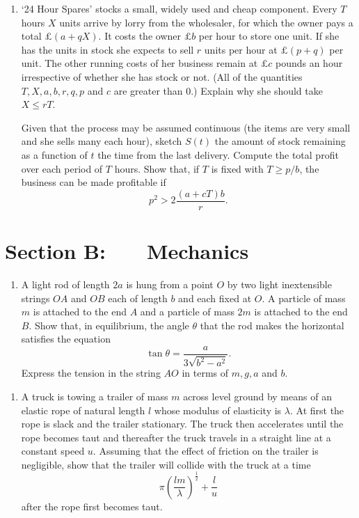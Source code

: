 \documentclass[a4, 11pt]{report}
\newlength{\qspace}
\newcounter{qnumber}
\newenvironment{question}%
 {\vspace{\qspace}
  \begin{enumerate}[\bfseries 1\quad][10]%
    \setcounter{enumi}{\value{qnumber}}%
    \item%
 }
{
  \end{enumerate}
  \filbreak
  \stepcounter{qnumber}
 }
\begin{document}
\begin{question}	
`24 Hour Spares' stocks a small, widely used and cheap component.
Every $T$ hours $X$ units arrive by lorry from the wholesaler, for
which the owner pays a total $\pounds (a+qX)$. It costs the owner $\pounds b$
per hour to store one unit. If she has the units in stock she expects
to sell $r$ units per hour at $\pounds(p+q)$ per unit. The other running
costs of her business remain at $\pounds c$ pounds an hour irrespective
of whether she has stock or not. (All of the quantities $T,X,a,b,r,q,p$
and $c$ are greater than 0.) Explain why she should take $X\leqslant rT$. 


Given that the process may be assumed continuous (the items are very
small and she sells many each hour), sketch $S(t)$ the amount of
stock remaining as a function of $t$ the time from the last delivery.
Compute the total profit over each period of $T$ hours. Show that,
if $T$ is fixed with $T\geqslant p/b$, the business can be made
profitable if 
\[
p^{2}>2\frac{(a+cT)b}{r}.
\]
\end{question}	
		

		
	
\newpage
\section*{Section B: \ \ \ Mechanics}


	
\begin{question}
A light rod of length $2a$ is hung from a point $O$ by two light
inextensible strings $OA$ and $OB$ each of length $b$ and each
fixed at $O$. A particle of mass $m$ is attached to the end $A$
and a particle of mass $2m$ is attached to the end $B.$ Show that,
in equilibrium, the angle $\theta$ that the rod makes the horizontal
satisfies the equation 
\[
\tan\theta=\frac{a}{3\sqrt{b^{2}-a^{2}}}.
\]
Express the tension in the string $AO$ in terms of $m,g,a$ and $b$.  
	\end{question}
	
\begin{question}	
A truck is towing a trailer of mass $m$ across level ground by means
of an elastic rope of natural length $l$ whose modulus of elasticity
is $\lambda.$ At first the rope is slack and the trailer stationary.
The truck then accelerates until the rope becomes taut and thereafter
the truck travels in a straight line at a constant speed $u$. Assuming
that the effect of friction on the trailer is negligible, show that
the trailer will collide with the truck at a time 
\[
\pi\left(\frac{lm}{\lambda}\right)^{\frac{1}{2}}+\frac{l}{u}
\]
after the rope first becomes taut.
\end{question}
\end{document}
